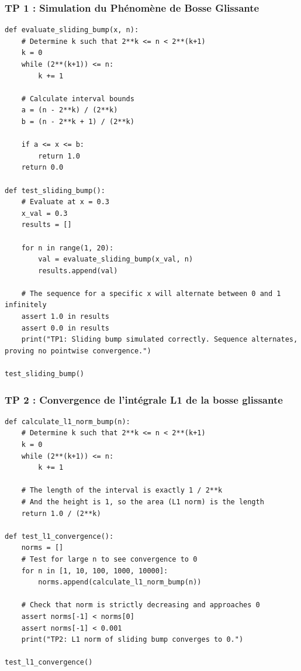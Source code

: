 \documentclass[11pt,a4paper]{article}
\begin{document}
\subsubsection*{TP 1 : Simulation du Phénomène de Bosse Glissante}
\begin{lstlisting}
def evaluate_sliding_bump(x, n):
    # Determine k such that 2**k <= n < 2**(k+1)
    k = 0
    while (2**(k+1)) <= n:
        k += 1

    # Calculate interval bounds
    a = (n - 2**k) / (2**k)
    b = (n - 2**k + 1) / (2**k)

    if a <= x <= b:
        return 1.0
    return 0.0

def test_sliding_bump():
    # Evaluate at x = 0.3
    x_val = 0.3
    results = []

    for n in range(1, 20):
        val = evaluate_sliding_bump(x_val, n)
        results.append(val)

    # The sequence for a specific x will alternate between 0 and 1 infinitely
    assert 1.0 in results
    assert 0.0 in results
    print("TP1: Sliding bump simulated correctly. Sequence alternates, proving no pointwise convergence.")

test_sliding_bump()
\end{lstlisting}

\subsubsection*{TP 2 : Convergence de l'intégrale L1 de la bosse glissante}
\begin{lstlisting}
def calculate_l1_norm_bump(n):
    # Determine k such that 2**k <= n < 2**(k+1)
    k = 0
    while (2**(k+1)) <= n:
        k += 1

    # The length of the interval is exactly 1 / 2**k
    # And the height is 1, so the area (L1 norm) is the length
    return 1.0 / (2**k)

def test_l1_convergence():
    norms = []
    # Test for large n to see convergence to 0
    for n in [1, 10, 100, 1000, 10000]:
        norms.append(calculate_l1_norm_bump(n))

    # Check that norm is strictly decreasing and approaches 0
    assert norms[-1] < norms[0]
    assert norms[-1] < 0.001
    print("TP2: L1 norm of sliding bump converges to 0.")

test_l1_convergence()
\end{lstlisting}
\end{document}

